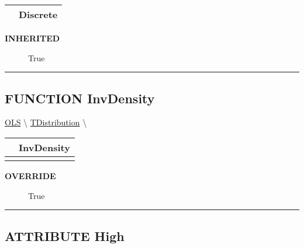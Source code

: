 {\renewcommand{\arraystretch}{1.5}
\begin{tabularx}{\textwidth}{|>{\raggedright\arraybackslash}l|X|}
\hline
\hspace{0pt}\mytexttt{\color{red} } & \textbf{Discrete} \\
\hline
\end{tabularx}
}

\par

\par
\begin{description}
\item [\colorbox{tagtype}{\color{white} \textbf{\textsf{INHERITED}}}] \textbf{\underline{}} True
\end{description}

\rule{\linewidth}{0.5pt}
\subsection*{\textsf{\colorbox{headtoc}{\color{white} FUNCTION}
InvDensity}}

\hypertarget{ecldoc:linearregression.ols.tdistribution.invdensity}{}
\hspace{0pt} \hyperlink{ecldoc:linearregression.ols}{OLS} \textbackslash 
\hspace{0pt} \hyperlink{ecldoc:linearregression.ols.tdistribution}{TDistribution} \textbackslash 

{\renewcommand{\arraystretch}{1.5}
\begin{tabularx}{\textwidth}{|>{\raggedright\arraybackslash}l|X|}
\hline
\hspace{0pt}\mytexttt{\color{red} } & \textbf{InvDensity} \\
\hline
\multicolumn{2}{|>{\raggedright\arraybackslash}X|}{\hspace{0pt}\mytexttt{\color{param} (t\_FieldReal delta)}} \\
\hline
\end{tabularx}
}

\par

\par
\begin{description}
\item [\colorbox{tagtype}{\color{white} \textbf{\textsf{OVERRIDE}}}] \textbf{\underline{}} True
\end{description}

\rule{\linewidth}{0.5pt}
\subsection*{\textsf{\colorbox{headtoc}{\color{white} ATTRIBUTE}
High}}

